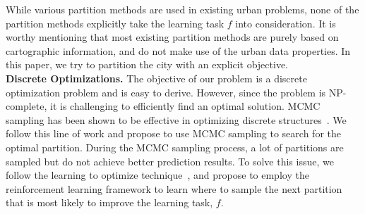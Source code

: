While various partition methods are used in existing urban problems, none of the partition methods explicitly take the learning task $f$ into consideration. It is worthy mentioning that most existing partition methods are purely based on cartographic information, and do not make use of the urban data properties. In this paper, we try to partition the city with an explicit objective. \\


\noindent\textbf{Discrete Optimizations.} The objective of our problem is a discrete optimization problem and is easy to derive. However, since the problem is NP-complete, it is challenging to efficiently find an optimal solution. MCMC sampling has been shown to be effective in optimizing discrete structures~\cite{strens2003evolutionary}. We follow this line of work and propose to use MCMC sampling to search for the optimal partition. During the MCMC sampling process, a lot of partitions are sampled but do not achieve better prediction results. To solve this issue, we follow the learning to optimize technique~\cite{li2016learning}, and propose to employ the reinforcement learning framework to learn where to sample the next partition that is most likely to improve the learning task, $f$.